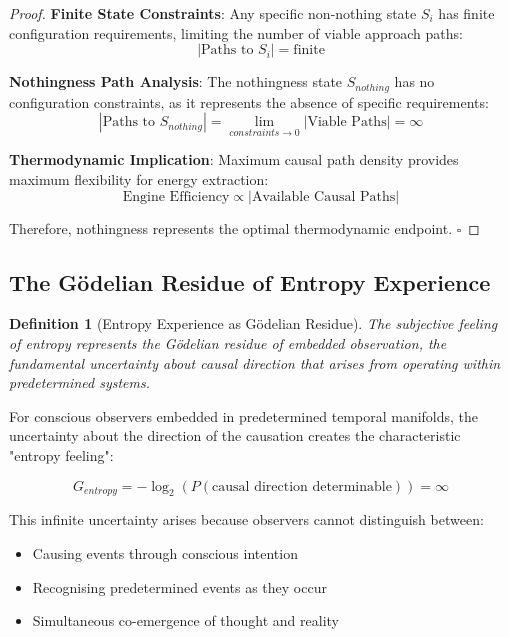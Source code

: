 \documentclass[11pt,a4paper]{article}
\newtheorem{definition}[theorem]{Definition}
\theoremstyle{remark}
\begin{document}
\begin{proof}
\textbf{Finite State Constraints}: Any specific non-nothing state $S_i$ has finite configuration requirements, limiting the number of viable approach paths:
\begin{equation}
|\text{Paths to } S_i| = \text{finite}
\end{equation}

\textbf{Nothingness Path Analysis}: The nothingness state $S_{nothing}$ has no configuration constraints, as it represents the absence of specific requirements:
\begin{equation}
|\text{Paths to } S_{nothing}| = \lim_{constraints \to 0} |\text{Viable Paths}| = \infty
\end{equation}

\textbf{Thermodynamic Implication}: Maximum causal path density provides maximum flexibility for energy extraction:
\begin{equation}
\text{Engine Efficiency} \propto |\text{Available Causal Paths}|
\end{equation}

Therefore, nothingness represents the optimal thermodynamic endpoint. $\square$
\end{proof}

\subsection{The Gödelian Residue of Entropy Experience}

\begin{definition}[Entropy Experience as Gödelian Residue]
The subjective feeling of entropy represents the Gödelian residue of embedded observation, the fundamental uncertainty about causal direction that arises from operating within predetermined systems.
\end{definition}

For conscious observers embedded in predetermined temporal manifolds, the uncertainty about the direction of the causation creates the characteristic "entropy feeling":

\begin{equation}
G_{entropy} = -\log_2(P(\text{causal direction determinable})) = \infty
\label{eq:goedel_entropy}
\end{equation}

This infinite uncertainty arises because observers cannot distinguish between:
\begin{itemize}
\item Causing events through conscious intention
\item Recognising predetermined events as they occur
\item Simultaneous co-emergence of thought and reality
\end{itemize}
\end{document}

